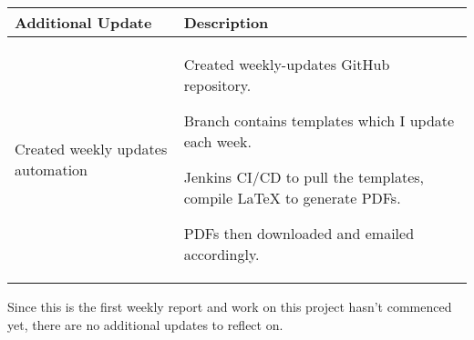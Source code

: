 \begin{table}[!h]
    \centering
    \begin{tabularx}{\textwidth}{|l|X|}
        \hline
        Additional Update & Description \\
        \hline
        \hline
        Created weekly updates automation & 
        \begin{myitemize}
            \item Created weekly-updates GitHub repository.
            \item Branch contains templates which I update each week.
            \item Jenkins CI/CD to pull the templates, compile LaTeX to generate PDFs.
            \item PDFs then downloaded and emailed accordingly.
        \end{myitemize} \\
        \hline
    \end{tabularx}
\end{table}

Since this is the first weekly report and work on this project hasn't commenced yet, there are no additional updates to reflect on.